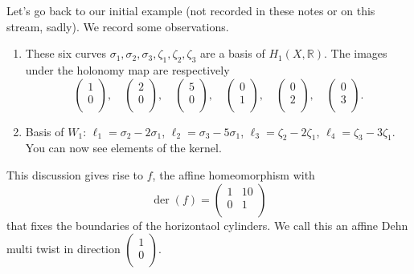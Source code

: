 \documentclass[reqno]{amsart} 
\numberwithin{theorem}{section}
\numberwithin{equation}{section}
\begin{document}
Let's go back to our initial example (not recorded in these notes or on this stream, sadly).  We record some observations.
\begin{enumerate}
\item These six curves $\sigma_1, \sigma_2, \sigma_3, \zeta_1, \zeta_2, \zeta_3$ are a basis of $H_1(X, \mathbb{R})$.  The images under the holonomy map are respectively
  \begin{equation*}
    \begin{pmatrix}
      1      \\
      0  \\
    \end{pmatrix},
    \quad
    \begin{pmatrix}
      2 \\
      0  \\
    \end{pmatrix},    \quad
    \begin{pmatrix}
      5 \\
      0  \\
    \end{pmatrix},    \quad
    \begin{pmatrix}
      0 \\
      1  \\
    \end{pmatrix},    \quad
    \begin{pmatrix}
      0 \\
      2  \\
    \end{pmatrix},    \quad
    \begin{pmatrix}
      0 \\
      3  \\
    \end{pmatrix}.
  \end{equation*}
\item Basis of $W_1$: $\ell_1 = \sigma_2 - 2 \sigma_1$, $\ell_2 = \sigma_3 - 5 \sigma_1$, $\ell_3 = \zeta_2 - 2 \zeta_1$, $\ell_4 = \zeta_3 - 3 \zeta_1$.  You can now see elements of the kernel.
\end{enumerate}
This discussion gives rise to $f$, the affine homeomorphism with
\begin{equation*}
  \operatorname{der}(f) =
  \begin{pmatrix}
    1    & 10 \\
    0 & 1 \\
  \end{pmatrix}
\end{equation*}
that fixes the boundaries of the horizontaol cylinders.  We call this an affine Dehn multi twist in direction $
\begin{pmatrix}
  1  \\
  0  \\
\end{pmatrix}$.
\end{document}
